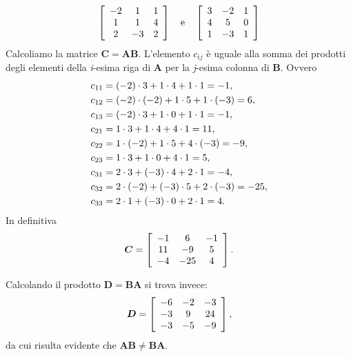\begin{displaymath}
\left[ \begin{array}{c c c}
-2 & 1 & 1\\
1 & 1 & 4\\
2 & -3 & 2
\end{array}
 \right] \quad \text{e} \quad
\left[ \begin{array}{c c c}
3 & -2 &1\\
4 & 5 & 0\\
1 & -3 & 1
\end{array}
 \right]
\end{displaymath}
Calcoliamo la matrice $\boldsymbol{C} = \boldsymbol{AB}$.
L'elemento $c_{ij}$ {\`e} uguale alla somma dei
prodotti degli elementi della \emph{i}-esima riga di
$\boldsymbol{A}$ per la \emph{j}-esima colonna di
$\boldsymbol{B}$. 
Ovvero
\begin{align}
c_{11} &= (-2) \cdot 3 + 1 \cdot 4 + 1 \cdot 1 = -1,\notag\\
c_{12} &= (-2) \cdot (-2) + 1 \cdot 5 + 1 \cdot (-3) = 6,\notag\\
c_{13} &= (-2) \cdot 3 + 1 \cdot 0 + 1 \cdot 1 = -1,\notag\\
c_{21} &= 1 \cdot 3 + 1 \cdot 4 + 4 \cdot 1 = 11,\notag\\
c_{22} &= 1 \cdot (-2) + 1 \cdot 5 + 4 \cdot (-3) = -9,\notag\\
c_{23} &= 1 \cdot 3 + 1 \cdot 0 + 4 \cdot 1 = 5,\notag\\
c_{31} &= 2 \cdot 3 +(-3) \cdot 4 + 2 \cdot 1 = -4,\notag\\
c_{32} &= 2 \cdot (-2) +(-3) \cdot 5 + 2 \cdot (-3) = -25,\notag\\
c_{33} &= 2 \cdot 1 + (-3) \cdot 0 + 2 \cdot 1 = 4.\notag
\end{align}
In definitiva
\begin{displaymath}
\boldsymbol{C} =  \left[ \begin{array}{c c c}
-1 & 6 & -1\\
11 & -9 & 5\\
-4 & -25 & 4
\end{array}
 \right].
\end{displaymath}

Calcolando il prodotto $\boldsymbol{D} = \boldsymbol{BA}$ si trova
invece:
\begin{displaymath}
\boldsymbol{D} =  \left[ \begin{array}{c c c}
-6 & -2 & -3\\
-3 & 9 & 24\\
-3 & -5 & -9
\end{array}
 \right],
\end{displaymath}
da cui risulta evidente che $\boldsymbol{AB} \neq
\boldsymbol{BA}$.

